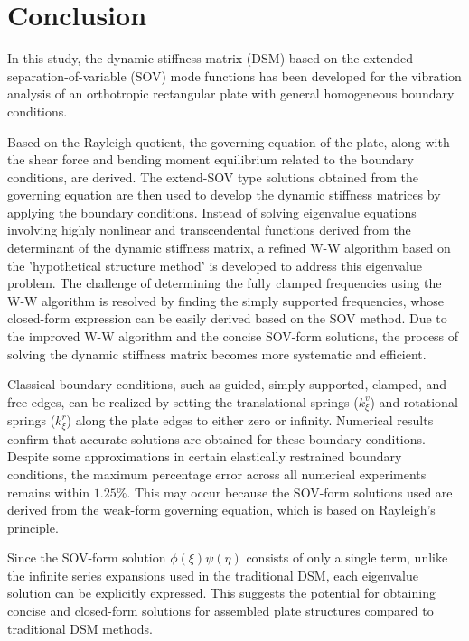 \documentclass[preprint,12pt]{elsarticle}
\begin{document}
\section{Conclusion}
In this study, the dynamic stiffness matrix (DSM) based on the extended separation-of-variable (SOV) mode functions has been developed for the vibration analysis of an orthotropic rectangular plate with general homogeneous boundary conditions.

Based on the Rayleigh quotient, the governing equation of the plate, along with the shear force and bending moment equilibrium related to the boundary conditions, are derived.  
The extend-SOV type solutions obtained from the governing equation are then used to develop the dynamic stiffness matrices by applying the boundary conditions.
Instead of solving eigenvalue equations involving highly nonlinear and transcendental functions derived from the determinant of the dynamic stiffness matrix, a refined W-W algorithm based on the 'hypothetical structure method' is developed to address this eigenvalue problem.
The challenge of determining the fully clamped frequencies using the W-W algorithm is resolved by finding the simply supported frequencies, whose closed-form expression can be easily derived based on the SOV method.  
Due to the improved W-W algorithm and the concise SOV-form solutions, the process of solving the dynamic stiffness matrix becomes more systematic and efficient.  

Classical boundary conditions, such as guided, simply supported, clamped, and free edges, can be realized by setting the translational springs (\(k^v_\xi\)) and rotational springs (\(k^r_\xi\)) along the plate edges to either zero or infinity.  
Numerical results confirm that accurate solutions are obtained for these boundary conditions.  
Despite some approximations in certain elastically restrained boundary conditions, the maximum percentage error across all numerical experiments remains within $1.25\%$.  
This may occur because the SOV-form solutions used are derived from the weak-form governing equation, which is based on Rayleigh's principle.  

Since the SOV-form solution \(\phi(\xi) \psi(\eta)\) consists of only a single term, unlike the infinite series expansions used in the traditional DSM, each eigenvalue solution can be explicitly expressed.  
This suggests the potential for obtaining concise and closed-form solutions for assembled plate structures compared to traditional DSM methods.  
\end{document}
